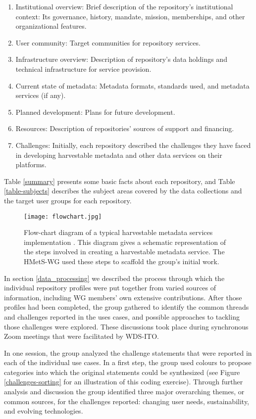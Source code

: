 \documentclass{interact}
\begin{document}
\begin{enumerate}
\item Institutional overview: Brief description of the repository's institutional context: Its governance, history, mandate, mission, memberships, and other organizational features.
\item User community: Target communities for repository services.
\item Infrastructure overview: Description of repository's data holdings and technical infrastructure for service provision.
\item Current state of metadata: Metadata formats, standards used, and metadata services (if any).
\item Planned development: Plans for future development.
\item Resources: Description of repositories' sources of support and financing.
\item Challenges: Initially, each repository described the challenges they have faced in developing harvestable metadata and other data services on their platforms.
\end{enumerate}

Table \ref{summary} presents some basic facts about each repository, and Table \ref{table-subjects} describes the subject areas covered by the data collections and the target user groups for each repository.

\begin{figure}
\centering
\texttt{[image: flowchart.jpg]}
\caption{Flow-chart diagram of a typical harvestable metadata services implementation \parencite{payne_2021}. This diagram gives a schematic representation of the steps involved in creating a harvestable metadata service. The HMetS-WG used these steps to scaffold the group's initial work.} \label{flowchart}
\end{figure}

In section \ref{data_processing} we described the process through which the individual repository profiles were put together from varied sources of information, including WG members' own extensive contributions. After those profiles had been completed, the group gathered to identify the common threads and challenges reported in the uses cases, and possible approaches to tackling those challenges were explored. These discussions took place during synchronous Zoom meetings that were facilitated by WDS-ITO.

In one session, the group analyzed the challenge statements that were reported in each of the individual use cases. In a first step, the group used colours to propose categories into which the original statements could be synthesized (see Figure \ref{challenges-sorting} for an illustration of this coding exercise). Through further analysis and discussion the group identified three major overarching themes, or common sources, for the challenges reported: changing user needs, sustainability, and evolving technologies. 
\end{document}
